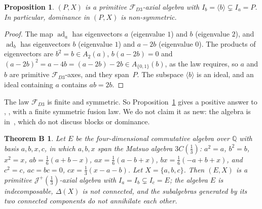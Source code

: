 \documentclass[11pt]{article}
\newif\ifwithB
\newtheorem{proposition}[lemma]{Proposition}
\newtheorem*{thmB}{Theorem B}
\theoremstyle{definition}
\theoremstyle{remark}
\newcommand{\Q}{\mathbb Q}
\newcommand{\cF}{\mathcal F}
\newcommand{\cJ}{\mathcal J}
\newcommand{\Jp}{\cJ^{+}}
\newcommand{\FD}{\cF_{D3}}
\newcommand{\ad}{\operatorname{ad}}
\newcommand{\third}{\tfrac13}
\begin{document}
\begin{proposition}\label{prop:peng}
$(P,X)$ is a primitive $\FD$-axial algebra with $I_b=\langle b\rangle
\subsetneq I_a=P$. In particular, dominance in $(P,X)$ is non-symmetric.
\end{proposition}

\begin{proof}
The map $\ad_a$ has eigenvectors $a$ (eigenvalue $1$) and $b$ (eigenvalue
$2$), and $\ad_b$ has eigenvectors $b$ (eigenvalue $1$) and $a-2b$
(eigenvalue $0$). The products of eigenvectors are $b^2=b\in A_2(a)$,
$b(a-2b)=0$ and $(a-2b)^2=a-4b=(a-2b)-2b\in A_{\{0,1\}}(b)$, as the law
requires, so $a$ and $b$ are primitive $\FD$-axes, and they span~$P$. The
subspace $\langle b\rangle$ is an ideal, and an ideal containing $a$
contains $ab=2b$.
\end{proof}

The law $\FD$ is finite and symmetric. So Proposition~\ref{prop:peng} gives a
positive answer to \cite[Question~9.3]{msz}, \cite[Problem~3.9]{gs}, with a
finite symmetric fusion law. We do not claim it as new: the algebra is
in~\cite{kmp,peng}, which do not discuss blocks or dominance.

\ifwithB
\begin{thmB}
Let $E$ be the four-dimensional commutative algebra over $\Q$ with basis
$a,b,x,c$, in which $a,b,x$ span the Matsuo algebra $3C(\third)$:
$a^2=a$, $b^2=b$, $x^2=x$, $ab=\frac16(a+b-x)$, $ax=\frac16(a-b+x)$,
$bx=\frac16(-a+b+x)$, and $c^2=c$, $ac=bc=0$, $cx=\third(x-a-b)$. Let
$X=\{a,b,c\}$. Then $(E,X)$ is a primitive $\Jp(\third)$-axial algebra with
$I_a=I_b\subsetneq I_c=E$; the algebra $E$ is indecomposable, $\Delta(X)$ is
not connected, and the subalgebras generated by its two connected components
do not annihilate each other.
\end{thmB}
\end{document}

